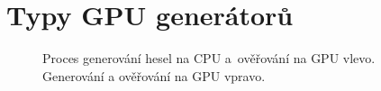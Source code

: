 \chapter{Typy GPU generátorů}
\label{CPUGPU}
\begin{figure}[ht]
    \begin{center}
    \end{center}
    \caption{Proces generování hesel na CPU a~ověřování na GPU vlevo. Generování a
	ověřování na GPU vpravo.\cite{Schmied}}
\end{figure}

